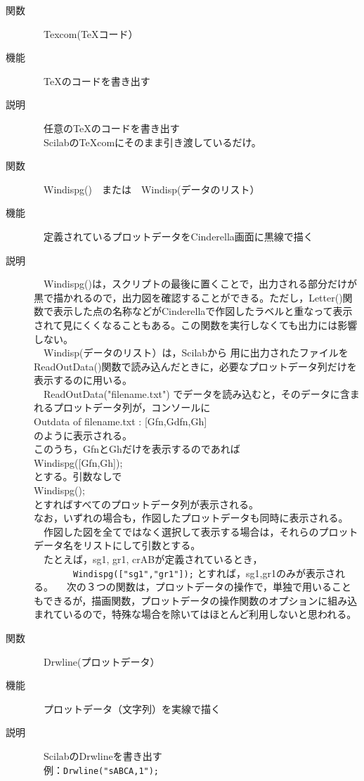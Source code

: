 \documentclass[papersize,a4paper,12pt,uplatex]{jsarticle}
\begin{document}
\begin{description}
\hypertarget{texcom}{}
\item[関数]　Texcom(\TeX コード）
\item[機能]　\TeX のコードを書き出す
\item[説明]　任意の\TeX のコードを書き出す\\
　ScilabのTeXcomにそのまま引き渡しているだけ。\\

\hypertarget{windispg}{}
\item[関数]　Windispg()　または　Windisp(データのリスト）
\item[機能]　定義されているプロットデータをCinderella画面に黒線で描く
\item[説明]　Windispg()は，スクリプトの最後に置くことで，出力される部分だけが黒で描かれるので，出力図を確認することができる。ただし，Letter()関数で表示した点の名称などがCinderellaで作図したラベルと重なって表示されて見にくくなることもある。この関数を実行しなくても出力には影響しない。\\
　Windisp(データのリスト）は，Scilabから \ketcindy 用に出力されたファイルを ReadOutData()関数で読み込んだときに，必要なプロットデータ列だけを表示するのに用いる。\\
　ReadOutData("filename.txt") でデータを読み込むと，そのデータに含まれるプロットデータ列が，コンソールに\\
Outdata of filename.txt : [Gfn,Gdfn,Gh] \\
のように表示される。\\
このうち，GfnとGhだけを表示するのであれば\\
Windispg([Gfn,Gh]);\\
 とする。引数なしで\\
Windispg();\\
とすればすべてのプロットデータ列が表示される。\\
なお，いずれの場合も，作図したプロットデータも同時に表示される。\\
　作図した図を全てではなく選択して表示する場合は，それらのプロットデータ名をリストにして引数とする。\\
　たとえば，sg1, gr1, crABが定義されているとき，\\
　　　　\verb|Windispg(["sg1","gr1"]);|
とすれば，sg1,gr1のみが表示される。
　次の３つの関数は，プロットデータの操作で，単独で用いることもできるが，描画関数，プロットデータの操作関数のオプションに組み込まれているので，特殊な場合を除いてはほとんど利用しないと思われる。\\

\hypertarget{drwline}{}
\item[関数]　Drwline(プロットデータ）
\item[機能]　プロットデータ（文字列）を実線で描く
\item[説明]　ScilabのDrwlineを書き出す\\
　例：\verb|Drwline("sABCA,1");|\\
\\


\end{description}
\end{document}
